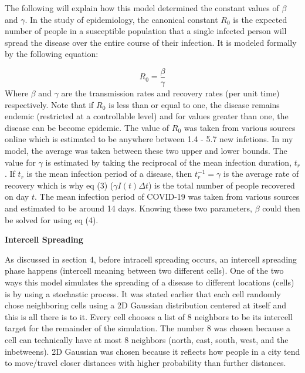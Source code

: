 \documentclass[a4paper]{article}
\begin{document}
The following will explain how this model determined the constant values of 
$\beta$ and $\gamma$. In the study of epidemiology, the canonical constant 
$R_0$ is the expected number of people in a susceptible population that a single 
infected person will spread the disease over the entire course of their infection. 
It is modeled formally by the following equation:

\begin{equation}
  R_0 = \frac{\beta}{\gamma}
\end{equation}
Where $\beta$ and $\gamma$ are the transmission rates and recovery rates (per
unit time)
respectively. Note that if $R_0$ is less than or equal to one, the disease remains endemic
(restricted at a controllable level) and for values greater than one, the
disease can be become epidemic. The value of $R_0$ was taken from various
sources online which is estimated to be anywhere between 1.4 - 5.7 new infetions.
In my model, the average was taken between these two upper and lower bounds.
The value for $\gamma$ is estimated by taking the reciprocal of the mean
infection duration, $t_r$. If $t_r$ is the mean infection period of a disease,
then $t_r^{-1} = \gamma$ is the average rate of recovery which is why eq (3)
($\gamma I(t)\Delta t$) is the total number of people recovered on day $t$.
The mean infection period of COVID-19 was taken from various sources and estimated to 
be around 14 days. Knowing these two parameters, $\beta$ could then be solved for using 
eq (4).

\bigskip

\textbf{Intercell Spreading}

As discussed in section 4, before intracell spreading occurs, an intercell
spreading phase happens (intercell meaning between two different cells).
One of the two ways this model simulates the spreading of a disease to different locations
(cells) is by using a stochastic process. It was stated earlier that each cell 
randomly chose neighboring cells using a 2D Gaussian distribution centered at itself 
and this is all there is to it. Every cell chooses a list of 8 neighbors to be 
its intercell target for the remainder of the simulation. The number 8 was 
chosen because a cell can technically have at most 8 neighbors (north, east, 
south, west, and the inbetweens). 2D Gaussian was chosen because it reflects how 
people in a city tend to move/travel closer distances with higher probability than further 
distances.
\end{document}
